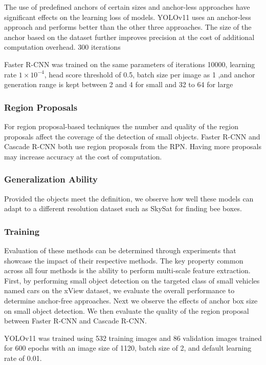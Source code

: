 \documentclass{article}
\begin{document}
The use of predefined anchors of certain sizes and anchor-less approaches have significant effects on the learning loss of models. YOLOv11 uses an anchor-less approach and performs better than the other three approaches. The size of the anchor based on the dataset further improves precision at the cost of additional computation overhead.
300 iterations


Faster R-CNN  was trained on the same parameters of iterations 10000, learning rate $1\times10^{-4}$, head score threshold of 0.5, batch size per image as 1 ,and anchor generation range is kept between 2 and 4 for small and 32 to 64 for large 

\subsubsection{Region Proposals}

For region proposal-based techniques the number and quality of the region proposals affect the coverage of the detection of small objects. Faster R-CNN and Cascade R-CNN both use region proposals from the RPN. Having more proposals may increase accuracy at the cost of computation. 

\subsubsection{Generalization Ability}

Provided the objects meet the definition, we observe how well these models can adapt to a different resolution dataset such as SkySat for finding bee boxes.



\subsubsection{Training}

Evaluation of these methods can be determined through experiments that showcase the impact of their respective methods. The key property common across all four methods is the ability to perform multi-scale feature extraction.
First, by performing small object detection on the targeted class of small vehicles named cars on the xView dataset, we evaluate the overall performance to determine anchor-free approaches.
Next we observe the effects of anchor box size on small object detection.
We then evaluate the quality of the region proposal between Faster R-CNN and Cascade R-CNN.

YOLOv11 was trained using 532 training images and 86 validation images trained for 600 epochs with an image size of 1120, batch size of 2, and default learning rate of 0.01.  
\end{document}

